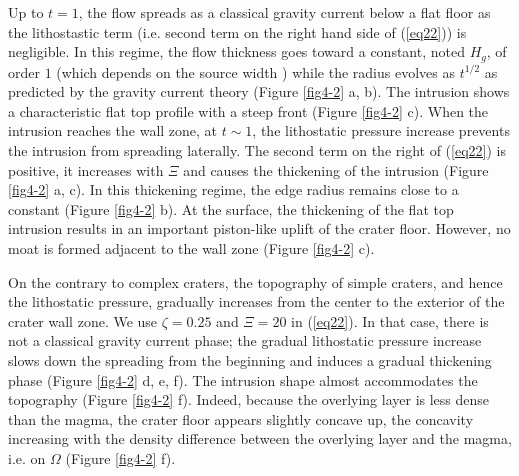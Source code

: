 \begin{article}
        Up to $t=1$,  the flow spreads as a  classical gravity current
        below a flat floor as  the lithostastic term (i.e. second term
        on the right hand side of (\ref{eq22})) is negligible. In this
        regime,  the  flow thickness  goes  toward  a constant,  noted
        $H_g$,  of  order  $1$  (which depends  on  the  source  width
        \citep{Michaut2009}) while the radius  evolves as $t^{1/2}$ as
        predicted  by the  gravity current  theory \citep{Huppert1982}
        (Figure   \ref{fig4-2}   a,   b).  The   intrusion   shows   a
        characteristic  flat top  profile with  a steep  front (Figure
        \ref{fig4-2} c). When the intrusion  reaches the wall zone, at
        $t\sim1$,  the  lithostatic  pressure  increase  prevents  the
        intrusion  from spreading  laterally. The  second term  on the
        right of (\ref{eq22}) is positive, it increases with $\Xi$ and
        causes the thickening of the intrusion (Figure \ref{fig4-2} a,
        c). In this  thickening regime, the edge  radius remains close
        to a  constant (Figure  \ref{fig4-2} b).  At the  surface, the
        thickening of the  flat top intrusion results  in an important
        piston-like uplift  of the crater  floor. However, no  moat is
        formed adjacent to the wall zone (Figure \ref{fig4-2} c).
		 
        On the contrary  to complex craters, the  topography of simple
        craters,  and   hence  the  lithostatic   pressure,  gradually
        increases from the  center to the exterior of  the crater wall
        zone.  We use  $\zeta=0.25$ and  $\Xi=20$ in  (\ref{eq22}). In
        that case, there is not a classical gravity current phase; the
        gradual lithostatic pressure increase slows down the spreading
        from  the beginning  and  induces a  gradual thickening  phase
        (Figure  \ref{fig4-2} d,  e,  f). The  intrusion shape  almost
        accommodates the  topography (Figure \ref{fig4-2}  f). Indeed,
        because the overlying layer is  less dense than the magma, the
        crater  floor  appears  slightly  concave  up,  the  concavity
        increasing with  the density difference between  the overlying
        layer and the magma, i.e. on $\Omega$ (Figure \ref{fig4-2} f).


\end{article}
